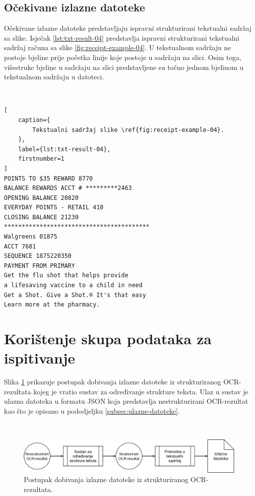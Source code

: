\documentclass[times, utf8, zavrsni]{fer}
\begin{document}
\subsection{Očekivane izlazne datoteke}
\label{subsec:ocekivane-izlazne-datoteke}
Očekivane izlazne datoteke predstavljaju ispravni strukturirani tekstualni
sadržaj sa slike. Isječak \ref{lst:txt-result-04} predstavlja ispravni
strukturirani tekstualni sadržaj računa sa slike \ref{fig:receipt-example-04}.
U tekstualnom sadržaju ne postoje bjeline prije početka linije koje
postoje u sadržaju na slici. Osim toga, višestruke bjeline u sadržaju na slici
predstavljene su točno jednom bjelinom u tekstualnom sadržaju u datoteci.

\

\begin{lstlisting}[
    caption={
        Tekstualni sadržaj slike \ref{fig:receipt-example-04}.
    },
    label={lst:txt-result-04},
    firstnumber=1
]
POINTS TO $35 REWARD 8770
BALANCE REWARDS ACCT # *********2463
OPENING BALANCE 20820
EVERYDAY POINTS - RETAIL 410
CLOSING BALANCE 21230
*****************************************
Walgreens 01875
ACCT 7681
SEQUENCE 1875220350
PAYMENT FROM PRIMARY
Get the flu shot that helps provide
a lifesaving vaccine to a child in need
Get a Shot. Give a Shot.® It's that easy
Learn more at the pharmacy.
\end{lstlisting}








\section{Korištenje skupa podataka za ispitivanje}
\label{sec:koristenje-skupa-podataka-za-ispitivanje}
Slika \ref{fig:sustav-02} prikazuje postupak dobivanja izlazne datoteke iz
strukturiranog OCR-rezultata kojeg je vratio sustav za određivanje strukture
teksta. Ulaz u sustav je ulazna datoteka u formatu JSON koja predstavlja
nestrukturirani OCR-rezultat kao što je opisano u pododjeljku
\ref{subsec:ulazne-datoteke}.

\

\begin{figure}[htb]
    \centering
    \captionsetup{justification=centering,margin=2cm}
    \includegraphics[width=\textwidth]{images/sustav-02.png}
    \caption{
        Postupak dobivanja izlazne datoteke iz strukturiranog OCR-rezultata.
    }
    \label{fig:sustav-02}
\end{figure}
\end{document}
